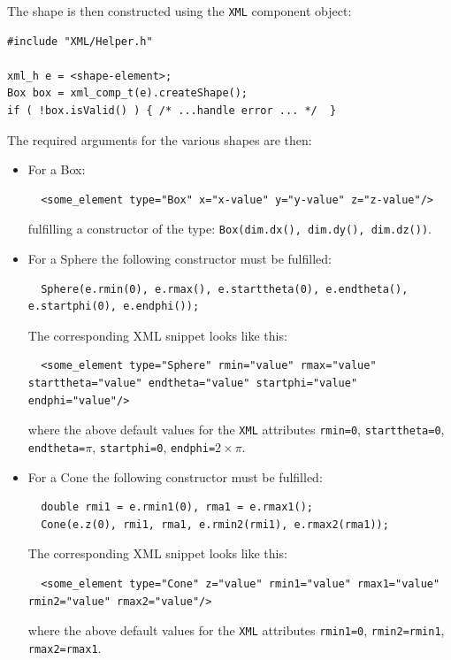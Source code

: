 The shape is then constructed using the \texttt{XML} component object:
\begin{verbatim}
#include "XML/Helper.h"

xml_h e = <shape-element>;
Box box = xml_comp_t(e).createShape();
if ( !box.isValid() ) { /* ...handle error ... */  }
\end{verbatim}
The required arguments for the various shapes are then:
\begin{itemize}
\item For a Box:
\begin{verbatim}
  <some_element type="Box" x="x-value" y="y-value" z="z-value"/>
\end{verbatim}
fulfilling a constructor of the type: \texttt{Box(dim.dx(), dim.dy(), dim.dz())}.

\item For a Sphere the following constructor must be fulfilled: 
\begin{verbatim}
  Sphere(e.rmin(0), e.rmax(), e.starttheta(0), e.endtheta(), e.startphi(0), e.endphi());
\end{verbatim}
The corresponding XML snippet looks like this:
\begin{verbatim}
  <some_element type="Sphere" rmin="value" rmax="value" starttheta="value" endtheta="value" startphi="value" endphi="value"/>
\end{verbatim}
where the above default values for the \texttt{XML} attributes \texttt{rmin=0}, \texttt{starttheta=0}, \texttt{endtheta=$\pi$},
\texttt{startphi=0}, \texttt{endphi=$2\times\pi$}.

\item For a Cone the following constructor must be fulfilled: 
\begin{verbatim}
  double rmi1 = e.rmin1(0), rma1 = e.rmax1();
  Cone(e.z(0), rmi1, rma1, e.rmin2(rmi1), e.rmax2(rma1));
\end{verbatim}
The corresponding XML snippet looks like this:
\begin{verbatim}
  <some_element type="Cone" z="value" rmin1="value" rmax1="value" rmin2="value" rmax2="value"/>
\end{verbatim}
where the above default values for the \texttt{XML} attributes \texttt{rmin1=0}, \texttt{rmin2=rmin1}, \texttt{rmax2=rmax1}.


\end{itemize}
